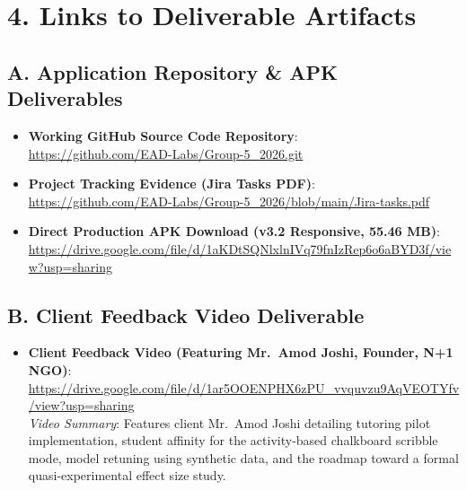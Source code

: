 \documentclass[10pt,a4paper]{article}
\begin{document}
\vspace{-2pt}
\section*{4. Links to Deliverable Artifacts}

\subsection*{A. Application Repository \& APK Deliverables}
\begin{itemize}[itemsep=1.5pt]
    \item \textbf{Working GitHub Source Code Repository}: \\
    \url{https://github.com/EAD-Labs/Group-5_2026.git}
    \item \textbf{Project Tracking Evidence (Jira Tasks PDF)}: \\
    \url{https://github.com/EAD-Labs/Group-5_2026/blob/main/Jira-tasks.pdf}
    \item \textbf{Direct Production APK Download (v3.2 Responsive, 55.46 MB)}: \\
    \url{https://drive.google.com/file/d/1aKDtSQNlxlnIVq79fnIzRep6o6aBYD3f/view?usp=sharing}
\end{itemize}

\subsection*{B. Client Feedback Video Deliverable}
\begin{itemize}[itemsep=1.5pt]
    \item \textbf{Client Feedback Video (Featuring Mr.~Amod Joshi, Founder, N+1 NGO)}: \\
    \url{https://drive.google.com/file/d/1ar5OOENPHX6zPU_vvquvzu9AqVEOTYfv/view?usp=sharing} \\
    \textit{Video Summary}: Features client Mr.~Amod Joshi detailing tutoring pilot implementation, student affinity for the activity-based chalkboard scribble mode, model retuning using synthetic data, and the roadmap toward a formal quasi-experimental effect size study.
\end{itemize}
\end{document}
